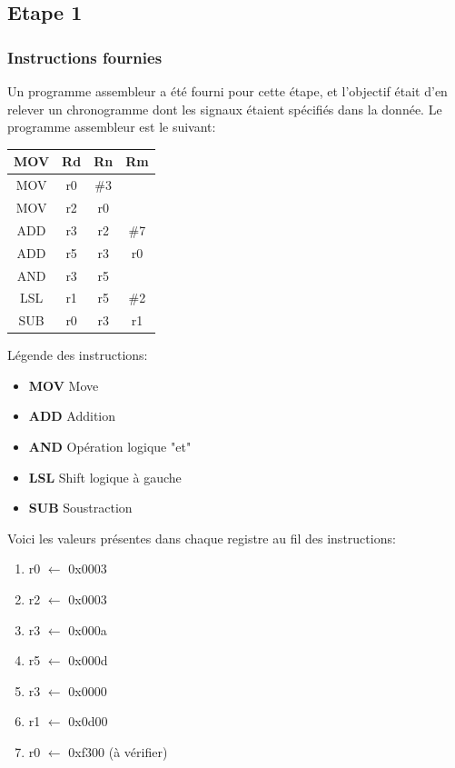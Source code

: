 \documentclass[a4paper]{article} %
\begin{document}
\subsection{Etape 1}
\subsubsection{Instructions fournies}
Un programme assembleur a été fourni pour cette étape, et l'objectif était d'en relever un chronogramme dont les signaux étaient spécifiés dans la donnée.
Le programme assembleur est le suivant:\medskip \\ 
\begin{center}
\begin{tabular}{|c|c|c|c|}
    \hline
    MOV  & Rd & Rn   & Rm  \\
    \hline
    MOV  & r0 & \#3  &     \\
    \hline
    MOV  & r2 & r0   &     \\
    \hline
    ADD  & r3 & r2   & \#7 \\
    \hline
    ADD  & r5 & r3   & r0  \\
    \hline
    AND  & r3 & r5   &     \\
    \hline
    LSL  & r1 & r5   & \#2 \\
    \hline
    SUB  & r0 & r3   & r1  \\
    \hline
\end{tabular}
\end{center}

Légende des instructions:
\begin{itemize}
    \item \textbf{MOV} Move
    \item \textbf{ADD} Addition
    \item \textbf{AND} Opération logique "et"
    \item \textbf{LSL} Shift logique à gauche
    \item \textbf{SUB} Soustraction    
\end{itemize}
\medskip
Voici les valeurs présentes dans chaque registre au fil des instructions:
\begin{enumerate}
    \item r0 $\leftarrow$ 0x0003
    \item r2 $\leftarrow$ 0x0003
    \item r3 $\leftarrow$ 0x000a
    \item r5 $\leftarrow$ 0x000d
    \item r3 $\leftarrow$ 0x0000
    \item r1 $\leftarrow$ 0x0d00
    \item r0 $\leftarrow$ 0xf300 (à vérifier)
\end{enumerate}
\end{document}

